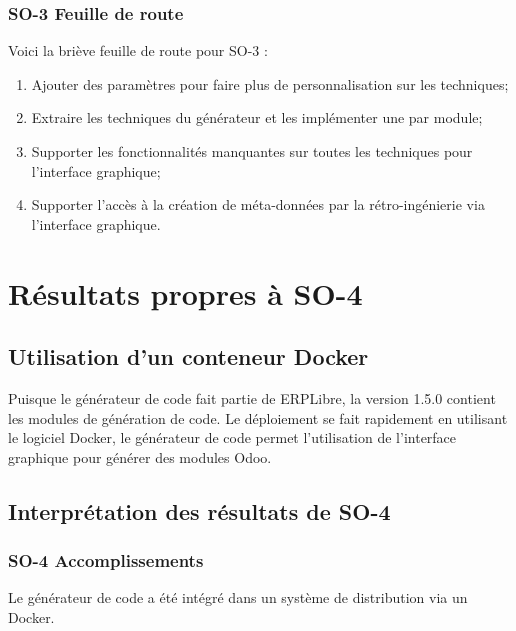 \subsubsection{SO-3 Feuille de route}
Voici la briève feuille de route pour SO-3 :
\begin{enumerate}
    \item Ajouter des paramètres pour faire plus de personnalisation sur les techniques;
    \item Extraire les techniques du générateur et les implémenter une par module;
    \item Supporter les fonctionnalités manquantes sur toutes les techniques pour l’interface graphique;
    \item Supporter l’accès à la création de méta-données par la rétro-ingénierie via l’interface graphique.
\end{enumerate}

\section{Résultats propres à SO-4}

\subsection{Utilisation d’un conteneur Docker}

Puisque le générateur de code fait partie de ERPLibre, la version 1.5.0 contient les modules de génération de code. Le déploiement se fait rapidement en utilisant le logiciel Docker, le générateur de code permet l’utilisation de l’interface graphique pour générer des modules Odoo.

\subsection{Interprétation des résultats de SO-4}

\subsubsection{SO-4 Accomplissements}
Le générateur de code a été intégré dans un système de distribution via un Docker.

